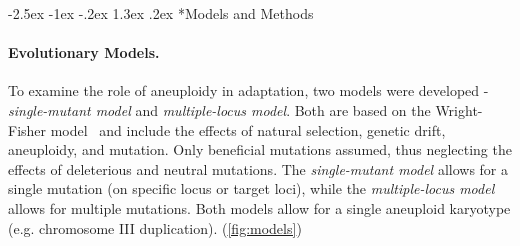 \documentclass[12pt]{extarticle}
\makeatletter
\renewcommand\section{\@startsection {section}{1}{\z@}%
     {-2.5ex \@plus -1ex \@minus -.2ex}%
     {1.3ex \@plus.2ex}%
    {\Large\bfseries}}
\makeatother
\begin{document}
\pagebreak
\section*{Models and Methods}

\paragraph*{Evolutionary Models.} To examine the role of aneuploidy in adaptation, two models were developed - \emph{single-mutant model} and \emph{multiple-locus model}. 
Both are based on the Wright-Fisher model~\citep{Tenaillon1999} and include the effects of natural selection, genetic drift, aneuploidy, and mutation. Only beneficial mutations assumed, 
thus neglecting the effects of deleterious and neutral mutations. The \emph{single-mutant model} allows for a single mutation (on specific locus or target loci), while the 
\emph{multiple-locus model} allows for multiple mutations. Both models allow for a single aneuploid karyotype (e.g. chromosome III duplication). (\autoref{fig:models})
\end{document}

